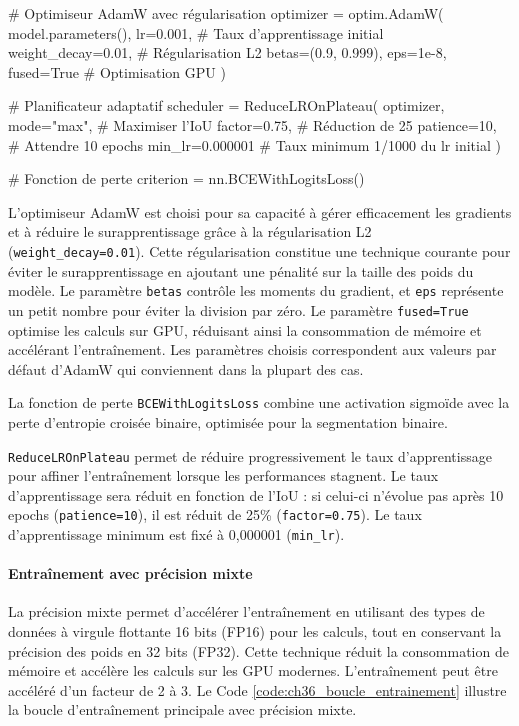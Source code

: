 \begin{code}[H]
    \begin{pythoncode}
    # Optimiseur AdamW avec régularisation
    optimizer = optim.AdamW(
        model.parameters(),
        lr=0.001,                    # Taux d'apprentissage initial
        weight_decay=0.01,           # Régularisation L2
        betas=(0.9, 0.999),
        eps=1e-8,
        fused=True                   # Optimisation GPU
    )
    
    # Planificateur adaptatif
    scheduler = ReduceLROnPlateau(
        optimizer,
        mode="max",                  # Maximiser l'IoU
        factor=0.75,                 # Réduction de 25%
        patience=10,                 # Attendre 10 epochs
        min_lr=0.000001             # Taux minimum 1/1000 du lr initial
    )
    
    # Fonction de perte
    criterion = nn.BCEWithLogitsLoss()
    \end{pythoncode}
    \caption{Configuration de l'optimiseur et planificateur}
    \label{code:ch36_optimiseur_smp}
\end{code}

L'optimiseur AdamW \cite{noauthor_adamw_nodate} est choisi pour sa capacité à gérer efficacement les gradients et à réduire le surapprentissage grâce à la régularisation L2 (\texttt{weight\_decay=0.01}). Cette régularisation constitue une technique courante pour éviter le surapprentissage en ajoutant une pénalité sur la taille des poids du modèle. Le paramètre \texttt{betas} contrôle les moments du gradient, et \texttt{eps} représente un petit nombre pour éviter la division par zéro. Le paramètre \texttt{fused=True} optimise les calculs sur GPU, réduisant ainsi la consommation de mémoire et accélérant l'entraînement. Les paramètres choisis correspondent aux valeurs par défaut d'AdamW qui conviennent dans la plupart des cas.

La fonction de perte \texttt{BCEWithLogitsLoss} combine une activation sigmoïde avec la perte d'entropie croisée binaire, optimisée pour la segmentation binaire.

\texttt{ReduceLROnPlateau} permet de réduire progressivement le taux d'apprentissage pour affiner l'entraînement lorsque les performances stagnent. Le taux d'apprentissage sera réduit en fonction de l'IoU : si celui-ci n'évolue pas après 10 epochs (\texttt{patience=10}), il est réduit de 25\% (\texttt{factor=0.75}). Le taux d'apprentissage minimum est fixé à 0,000001 (\texttt{min\_lr}).

\paragraph{Entraînement avec précision mixte}
La précision mixte \cite{noauthor_automatic_nodate} permet d'accélérer l'entraînement en utilisant des types de données à virgule flottante 16 bits (FP16) pour les calculs, tout en conservant la précision des poids en 32 bits (FP32). Cette technique réduit la consommation de mémoire et accélère les calculs sur les GPU modernes. L'entraînement peut être accéléré d'un facteur de 2 à 3. Le Code \ref{code:ch36_boucle_entrainement} illustre la boucle d'entraînement principale avec précision mixte.

